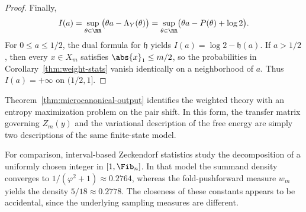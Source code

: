 \begin{proof}
Finally,
\[
I(a)=\sup_{\theta\in\RR}\bigl(\theta a-\Lambda_Y(\theta)\bigr)
=
\sup_{\theta\in\RR}\bigl(\theta a-P(\theta)+\log 2\bigr).
\]
For \(0\le a\le 1/2\), the dual formula for \(\mathfrak h\) yields \(I(a)=\log 2-\mathfrak h(a)\). If \(a>1/2\), then every \(x\in X_m\) satisfies \(\abs{x}_1\le m/2\), so the probabilities in Corollary~\ref{thm:weight-stats} vanish identically on a neighborhood of \(a\). Thus \(I(a)=+\infty\) on \((1/2,1]\).
\end{proof}

Theorem~\ref{thm:microcanonical-output} identifies the weighted theory with an entropy maximization problem on the pair shift. In this form, the transfer matrix governing \(Z_m(y)\) and the variational description of the free energy are simply two descriptions of the same finite-state model.

For comparison, interval-based Zeckendorf statistics \cite{KologluKoppMillerWang2011,MillerWang2012,BowerInsoftLiMillerTosteson2015} study the decomposition of a uniformly chosen integer in \([1,\Fib_n]\). In that model the summand density converges to \(1/(\varphi^2+1)\approx 0.2764\), whereas the fold-pushforward measure \(w_m\) yields the density \(5/18\approx 0.2778\). The closeness of these constants appears to be accidental, since the underlying sampling measures are different.

